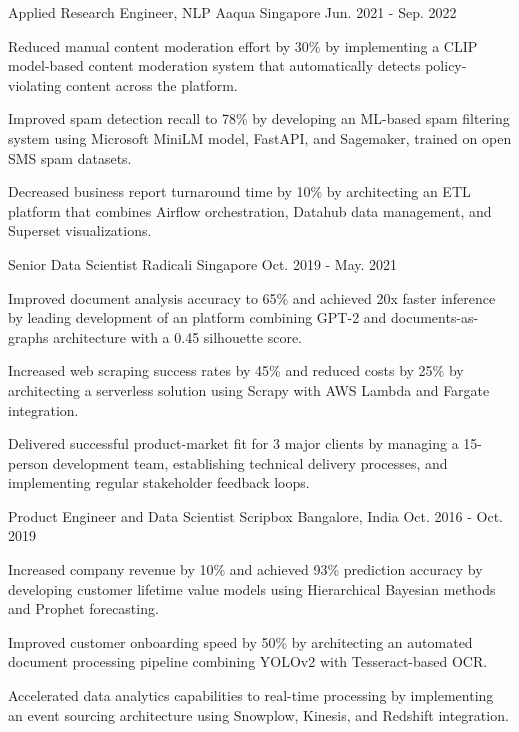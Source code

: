 \begin{cventries}
  \cventry
    {Applied Research Engineer, NLP} %
    {Aaqua} %
    {Singapore} %
    {Jun. 2021  - Sep. 2022} %
    {
      \begin{cvitems} %
        \item {Reduced manual content moderation effort by 30\% by implementing a CLIP model-based content moderation system that automatically detects policy-violating content across the platform.}
        \item {Improved spam detection recall to 78\% by developing an ML-based spam filtering system using Microsoft MiniLM model, FastAPI, and Sagemaker, trained on open SMS spam datasets.}
        \item {Decreased business report turnaround time by 10\% by architecting an ETL platform that combines Airflow orchestration, Datahub data management, and Superset visualizations.}
      \end{cvitems}
    }

  \cventry
    {Senior Data Scientist} %
    {Radicali} %
    {Singapore} %
    {Oct. 2019 - May. 2021} %
    {
      \begin{cvitems} %
        \item {Improved document analysis accuracy to 65\% and achieved 20x faster inference by leading development of an platform combining GPT-2 and documents-as-graphs architecture with a 0.45 silhouette score.}
        \item{Increased web scraping success rates by 45\% and reduced costs by 25\% by architecting a serverless solution using Scrapy with AWS Lambda and Fargate integration.}
        \item{Delivered successful product-market fit for 3 major clients by managing a 15-person development team, establishing technical delivery processes, and implementing regular stakeholder feedback loops.}
      \end{cvitems}
    }
  \cventry
    {Product Engineer and Data Scientist} %
    {Scripbox} %
    {Bangalore, India} %
    {Oct. 2016 - Oct. 2019} %
    {
      \begin{cvitems} %
        \item {Increased company revenue by 10\% and achieved 93\% prediction accuracy by developing customer lifetime value models using Hierarchical Bayesian methods and Prophet forecasting.}
        \item{Improved customer onboarding speed by 50\% by architecting an automated document processing pipeline combining YOLOv2 with Tesseract-based OCR. }
        \item{Accelerated data analytics capabilities to real-time processing by implementing an event sourcing architecture using Snowplow, Kinesis, and Redshift integration.}
      \end{cvitems}
    }


\end{cventries}
